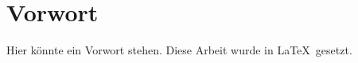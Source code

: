 \section*{Vorwort}
Hier könnte ein Vorwort stehen.
\vfill
Diese Arbeit wurde in \LaTeX\  gesetzt.\\
